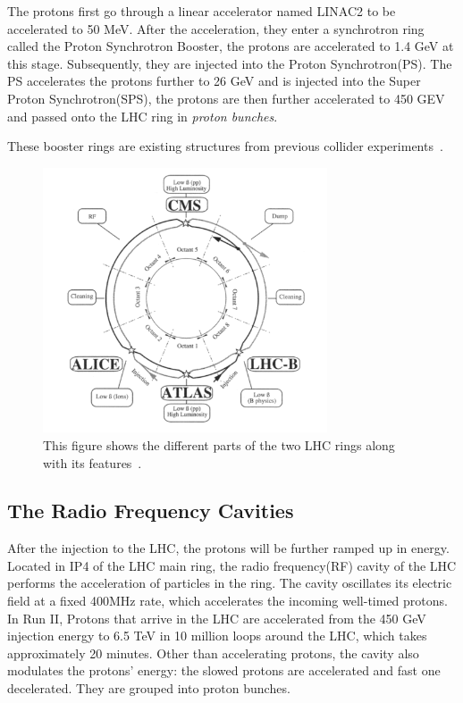 The protons first go through a linear accelerator named LINAC2 to be accelerated to 50 MeV. After the acceleration, they enter a synchrotron ring called the Proton Synchrotron Booster, the protons are accelerated to 1.4 GeV at this stage. Subsequently, they are injected into the Proton Synchrotron(PS). The PS accelerates the protons further to 26 GeV and is injected into the Super Proton Synchrotron(SPS), the protons are then further accelerated to 450 GEV and passed onto the LHC ring in \textit{proton bunches}.

These booster rings are existing structures from previous collider experiments~\cite{ATLAS:1999vwa}.

\begin{figure}[!htb]
    \begin{center}
        \includegraphics[width=0.75\textwidth]{figures/chapter_ATLAS/LHCRing}
        \caption{
			This figure shows the different parts of the two LHC rings along with its features~\cite{Pettersson:291782}.
        }
        \label{fig:perterson}
    \end{center}
\end{figure}

\subsection{The Radio Frequency Cavities}
After the injection to the LHC, the protons will be further ramped up in energy. Located in IP4 of the LHC main ring, the radio frequency(RF) cavity of the LHC performs the acceleration of particles in the ring. The cavity oscillates its electric field at a fixed 400MHz rate, which accelerates the incoming well-timed protons. In Run II, Protons that arrive in the LHC are accelerated from the 450 GeV injection energy to 6.5 TeV in 10 million loops around the LHC, which takes approximately 20 minutes. Other
than accelerating protons, the cavity also modulates the protons' energy: the slowed protons are accelerated and fast one decelerated. They are grouped into proton bunches.

